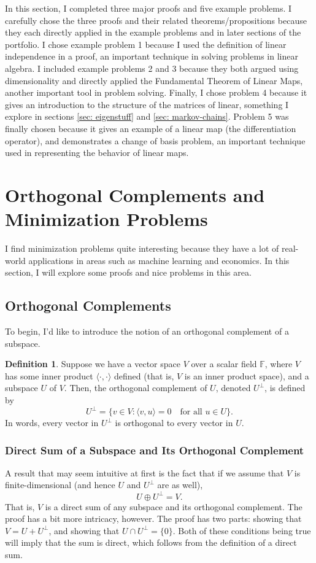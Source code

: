 \documentclass{article}
\newcommand{\F}{\mathbb{F}}
\newcommand{\la}{\langle}
\newcommand{\ra}{\rangle}
\theoremstyle{definition}
\newtheorem{definition}{Definition}
\begin{document}
In this section, I completed three major proofs and five example problems. I carefully chose the three proofs and their related theorems/propositions because they each directly applied in the example problems and in later sections of the portfolio. I chose example problem 1 because I used the definition of linear independence in a proof, an important technique in solving problems in linear algebra. I included example problems 2 and 3 because they both argued using dimensionality and directly applied the Fundamental Theorem of Linear Maps, another important tool in problem solving. Finally, I chose problem 4 because it gives an introduction to the structure of the matrices of linear, something I explore in sections \ref{sec: eigenstuff} and \ref{sec: markov-chains}. Problem 5 was finally chosen because it gives an example of a linear map (the differentiation operator), and demonstrates a change of basis problem, an important technique used in representing the behavior of linear maps.

\section{Orthogonal Complements and Minimization Problems}
\label{sec: Orthogonal Complements and Minimization Problems}

I find minimization problems quite interesting because they have a lot of real-world applications in areas such as machine learning and economics. In this section, I will explore some proofs and nice problems in this area.

\subsection{Orthogonal Complements}
To begin, I'd like to introduce the notion of an orthogonal complement of a subspace.

\begin{definition}
    Suppose we have  a vector space $V$ over a scalar field $\F$, where $V$ has some inner product $\la \cdot, \cdot \ra$ defined (that is, $V$ is an inner product space), and a subspace $U$ of $V$. Then, the orthogonal complement of $U$, denoted $U^\perp$, is defined by $$U^\perp = \{v \in V : \la v, u \ra = 0 \quad \text{for all $u \in U$}\}.$$ In words, every vector in $U^\perp$ is orthogonal to every vector in $U$.
\end{definition}

\subsubsection{Direct Sum of a Subspace and Its Orthogonal Complement}
\label{sec: orthogonal-complement}
A result that may seem intuitive at first is the fact that if we assume that $V$ is finite-dimensional (and hence $U$ and $U^\perp$ are as well), $$U \oplus U^\perp = V.$$ That is, $V$ is a direct sum of any subspace and its orthogonal complement. The proof has a bit more intricacy, however. The proof has two parts: showing that $V = U + U^\perp$, and showing that $U \cap U^\perp = \{0\}$. Both of these conditions being true will imply that the sum is direct, which follows from the definition of a direct sum.
\end{document}
